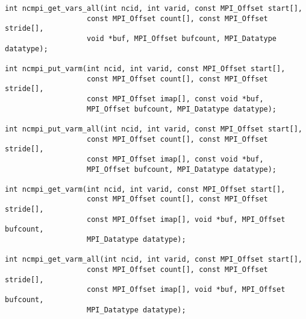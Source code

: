 \begin{verbatim}
int ncmpi_get_vars_all(int ncid, int varid, const MPI_Offset start[],
                   const MPI_Offset count[], const MPI_Offset stride[],
                   void *buf, MPI_Offset bufcount, MPI_Datatype datatype);

int ncmpi_put_varm(int ncid, int varid, const MPI_Offset start[],
                   const MPI_Offset count[], const MPI_Offset stride[],
                   const MPI_Offset imap[], const void *buf,
                   MPI_Offset bufcount, MPI_Datatype datatype);

int ncmpi_put_varm_all(int ncid, int varid, const MPI_Offset start[],
                   const MPI_Offset count[], const MPI_Offset stride[],
                   const MPI_Offset imap[], const void *buf,
                   MPI_Offset bufcount, MPI_Datatype datatype);

int ncmpi_get_varm(int ncid, int varid, const MPI_Offset start[],
                   const MPI_Offset count[], const MPI_Offset stride[],
                   const MPI_Offset imap[], void *buf, MPI_Offset bufcount,
                   MPI_Datatype datatype);

int ncmpi_get_varm_all(int ncid, int varid, const MPI_Offset start[],
                   const MPI_Offset count[], const MPI_Offset stride[],
                   const MPI_Offset imap[], void *buf, MPI_Offset bufcount,
                   MPI_Datatype datatype);
\end{verbatim}

